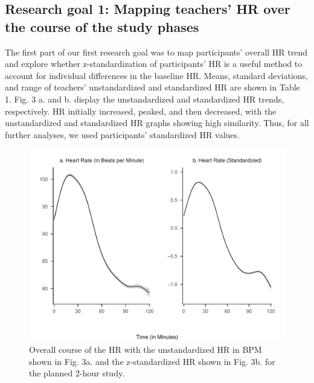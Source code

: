 \documentclass[preprint, 3p,
authoryear]{elsarticle} %
\begin{document}
\subsection{Research goal 1: Mapping teachers' HR over the course of the
study
phases}\label{research-goal-1-mapping-teachers-hr-over-the-course-of-the-study-phases}

The first part of our first research goal was to map participants'
overall HR trend and explore whether z-standardization of participants'
HR is a useful method to account for individual differences in the
baseline HR. Means, standard deviations, and range of teachers'
unstandardized and standardized HR are shown in Table 1. Fig. 3 a. and
b. display the unstandardized and standardized HR trends, respectively.
HR initially increased, peaked, and then decreased, with the
unstandardized and standardized HR graphs showing high similarity. Thus,
for all further analyses, we used participants' standardized HR values.



\begin{figure}[htbp]
  \centering
  \includegraphics[width=1\textwidth]{plots_publication/loess_plot_std_unstd_new.pdf}
  \caption{Overall course of the HR with the unstandardized HR in BPM shown in Fig. 3a. and the z-standardized HR shown in Fig. 3b. for the planned 2-hour study.}
  \label{Overall course of the HR with the unstandardized HR in BPM shown in Fig. 3a. and the z-standardized HR shown in Fig. 3b. for the planned 2-hour study.}
\end{figure}
\end{document}
